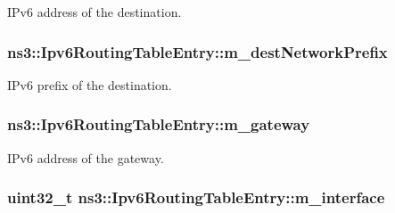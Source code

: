 I\+Pv6 address of the destination. 

\subsubsection[{\texorpdfstring{m\+\_\+dest\+Network\+Prefix}{m_destNetworkPrefix}}]{ ns3\+::\+Ipv6\+Routing\+Table\+Entry\+::m\+\_\+dest\+Network\+Prefix\hspace{0.3cm}{\ttfamily [private]}}\hypertarget{classns3_1_1Ipv6RoutingTableEntry_ab2925ceb15892b5c030bf74381affcf7}{}\label{classns3_1_1Ipv6RoutingTableEntry_ab2925ceb15892b5c030bf74381affcf7}


I\+Pv6 prefix of the destination. 

\subsubsection[{\texorpdfstring{m\+\_\+gateway}{m_gateway}}]{ ns3\+::\+Ipv6\+Routing\+Table\+Entry\+::m\+\_\+gateway\hspace{0.3cm}{\ttfamily [private]}}\hypertarget{classns3_1_1Ipv6RoutingTableEntry_a10a62f82acb3f1f3d4f26f886d915d67}{}\label{classns3_1_1Ipv6RoutingTableEntry_a10a62f82acb3f1f3d4f26f886d915d67}


I\+Pv6 address of the gateway. 

\subsubsection[{\texorpdfstring{m\+\_\+interface}{m_interface}}]{\setlength{\rightskip}{0pt plus 5cm}uint32\+\_\+t ns3\+::\+Ipv6\+Routing\+Table\+Entry\+::m\+\_\+interface\hspace{0.3cm}{\ttfamily [private]}}\hypertarget{classns3_1_1Ipv6RoutingTableEntry_ab6cb2c1f75bd8a9898404788138d901d}{}\label{classns3_1_1Ipv6RoutingTableEntry_ab6cb2c1f75bd8a9898404788138d901d}


